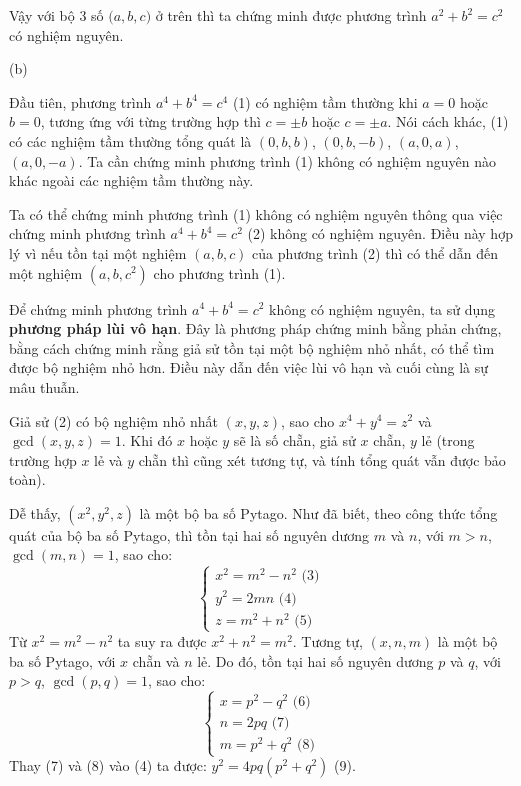Vậy với bộ 3 số $\big( a, b, c \big)$ ở trên thì ta chứng minh được phương trình $a^2 + b^2 = c^2$ có nghiệm nguyên.


(b)

Đầu tiên, phương trình $a^4 + b^4 = c^4$ (1) có nghiệm tầm thường khi $a = 0$ hoặc $b = 0$, tương ứng với từng trường hợp thì $c =\pm b$ hoặc $c = \pm a$. Nói cách khác, (1) có các nghiệm tầm thường tổng quát là $(0, b, b)$, $(0, b, -b)$, $(a, 0, a)$, $(a, 0, -a)$. Ta cần chứng minh phương trình (1) không có nghiệm nguyên nào khác ngoài các nghiệm tầm thường này.

Ta có thể chứng minh phương trình (1) không có nghiệm nguyên thông qua việc chứng minh phương trình $a^4 + b^4 = c^2$ (2) không có nghiệm nguyên. Điều này hợp lý vì nếu tồn tại một nghiệm $(a, b, c)$ của phương trình (2) thì có thể dẫn đến một nghiệm $(a, b, c^2)$ cho phương trình (1).

Để chứng minh phương trình $a^4 + b^4 = c^2$ không có nghiệm nguyên, ta sử dụng \textbf{phương pháp lùi vô hạn}. Đây là phương pháp chứng minh bằng phản chứng, bằng cách chứng minh rằng giả sử tồn tại một bộ nghiệm nhỏ nhất, có thể tìm được bộ nghiệm nhỏ hơn. Điều này dẫn đến việc lùi vô hạn và cuối cùng là sự mâu thuẫn.

Giả sử (2) có bộ nghiệm nhỏ nhất $(x, y, z)$, sao cho $x^4 + y^4 = z^2$ và $\gcd (x, y, z) = 1$. Khi đó $x$ hoặc $y$ sẽ là số chẵn, giả sử $x$ chẵn, $y$ lẻ (trong trường hợp $x$ lẻ và $y$ chẵn thì cũng xét tương tự, và tính tổng quát vẫn được bảo toàn).

Dễ thấy, $(x^2, y^2, z)$ là một bộ ba số Pytago. Như đã biết, theo công thức tổng quát của bộ ba số Pytago, thì tồn tại hai số nguyên dương $m$ và $n$, với $m > n$, $\gcd (m, n) = 1$, sao cho:
$$ \begin{cases}
        x^2 = m^2 - n^2 \text{ (3)}\\
        y^2 = 2mn \text{ (4)}\\
        z = m^2 + n^2 \text{ (5)}
\end{cases} $$
Từ $x^2 = m^2 - n^2$ ta suy ra được $x^2 + n^2 = m^2$. Tương tự, $(x, n, m)$ là một bộ ba số Pytago, với $x$ chẵn và $n$ lẻ. Do đó, tồn tại hai số nguyên dương $p$ và $q$, với $p > q$, $\gcd (p, q) = 1$, sao cho:
$$ \begin{cases}
        x = p^2 - q^2 \text{ (6)}\\
        n = 2pq \text{ (7)}\\
        m = p^2 + q^2 \text{ (8)}
\end{cases} $$
Thay (7) và (8) vào (4) ta được: $y^2 = 4pq(p^2 + q^2)$ (9).


